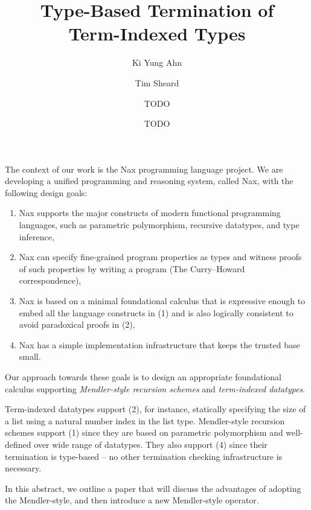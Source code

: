 \documentclass[a4paper]{easychair} %
\title{Type-Based Termination of\\ Term-Indexed Types}
\author{
Ki Yung Ahn\inst{1}
\and
Tim Sheard\inst{1}
 \and
TODO\inst{2}
 \and
TODO\inst{2}
}
\institute{
  Portland State University,\thanks{Funded by XXX project.} \\
  Portland, OR, USA
\and
  University of Cambridge, \\
  Cambridge, UK
}
\begin{document}
\maketitle


The context of our work is the Nax programming language project.
We are developing a unified programming and reasoning system,
called Nax, with the following design goals:\vspace*{-1ex}
\begin{enumerate}[(1)]
 \item Nax supports the major constructs of modern functional programming languages,
 such as parametric polymorphism, recursive datatypes, and type inference,
 \vspace*{-1.2ex}
 \item Nax can specify fine-grained program properties as types and
 witness proofs of such properties by writing a program (The Curry--Howard correspondence),
 \vspace*{-1.2ex}
 \item Nax is based on a minimal foundational calculus
 that is expressive enough to embed all the language constructs in (1)
 and is also logically consistent to avoid paradoxical proofs in (2),
 \vspace*{-1.2ex}
 \item Nax has a simple implementation infrastructure that keeps the trusted base small.
\end{enumerate}
Our approach towards these goals is to 
design an appropriate foundational calculus supporting
\emph{Mendler-style recursion schemes}
and \emph{term-indexed datatypes}.

Term-indexed datatypes support (2), for instance,
statically specifying the size of a list using a natural number index in the list type.
Mendler-style recursion schemes support (1) since they are based
on parametric polymorphism and well-defined over wide range of datatypes.
They also support (4) since their termination is type-based --
no other termination checking infrastructure is necessary.

In this abstract, we outline a paper
that will discuss the advantages of adopting the Mendler-style,
and then introduce a new Mendler-style operator.

\vspace*{-.5ex}
\end{document}
